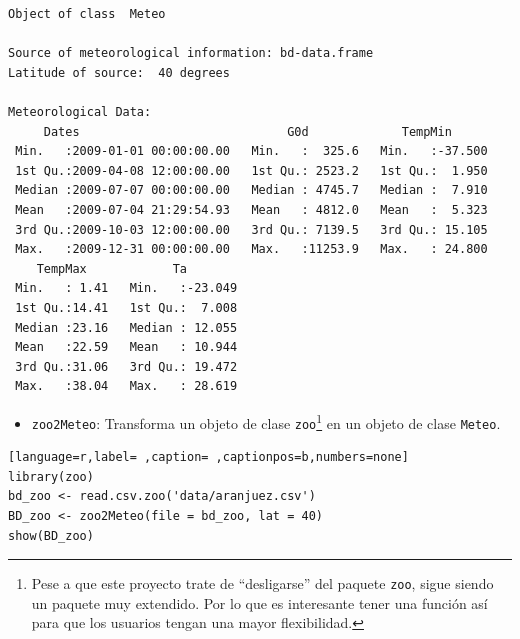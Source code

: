 \begin{verbatim}
Object of class  Meteo 

Source of meteorological information: bd-data.frame 
Latitude of source:  40 degrees

Meteorological Data:
     Dates                             G0d             TempMin       
 Min.   :2009-01-01 00:00:00.00   Min.   :  325.6   Min.   :-37.500  
 1st Qu.:2009-04-08 12:00:00.00   1st Qu.: 2523.2   1st Qu.:  1.950  
 Median :2009-07-07 00:00:00.00   Median : 4745.7   Median :  7.910  
 Mean   :2009-07-04 21:29:54.93   Mean   : 4812.0   Mean   :  5.323  
 3rd Qu.:2009-10-03 12:00:00.00   3rd Qu.: 7139.5   3rd Qu.: 15.105  
 Max.   :2009-12-31 00:00:00.00   Max.   :11253.9   Max.   : 24.800  
    TempMax            Ta         
 Min.   : 1.41   Min.   :-23.049  
 1st Qu.:14.41   1st Qu.:  7.008  
 Median :23.16   Median : 12.055  
 Mean   :22.59   Mean   : 10.944  
 3rd Qu.:31.06   3rd Qu.: 19.472  
 Max.   :38.04   Max.   : 28.619
\end{verbatim}

\begin{itemize}
\item \texttt{zoo2Meteo}: Transforma un objeto de clase \texttt{zoo}\footnote{Pese a que este proyecto trate de ``desligarse'' del paquete \texttt{zoo}, sigue siendo un paquete muy extendido. Por lo que es interesante tener una función así para que los usuarios tengan una mayor flexibilidad.} en un objeto de clase \texttt{Meteo}.
\end{itemize}
\begin{lstlisting}[language=r,label= ,caption= ,captionpos=b,numbers=none]
library(zoo)
bd_zoo <- read.csv.zoo('data/aranjuez.csv')
BD_zoo <- zoo2Meteo(file = bd_zoo, lat = 40)
show(BD_zoo)
\end{lstlisting}

